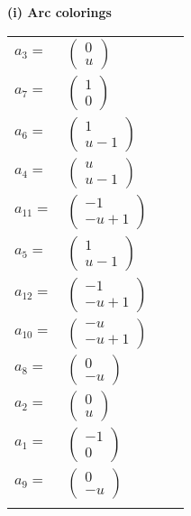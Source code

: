 \documentclass[1p]{elsarticle_modified}
\theoremstyle{definition}
\begin{document}
\flushleft \textbf{(i) Arc colorings}\\
\begin{tabular}{m{7pt} m{180pt} m{7pt} m{180pt} }
\flushright $a_{3}=$&$\begin{pmatrix}0\\u\end{pmatrix}$ \\
\flushright $a_{7}=$&$\begin{pmatrix}1\\0\end{pmatrix}$ \\
\flushright $a_{6}=$&$\begin{pmatrix}1\\u-1\end{pmatrix}$ \\
\flushright $a_{4}=$&$\begin{pmatrix}u\\u-1\end{pmatrix}$ \\
\flushright $a_{11}=$&$\begin{pmatrix}-1\\- u+1\end{pmatrix}$ \\
\flushright $a_{5}=$&$\begin{pmatrix}1\\u-1\end{pmatrix}$ \\
\flushright $a_{12}=$&$\begin{pmatrix}-1\\- u+1\end{pmatrix}$ \\
\flushright $a_{10}=$&$\begin{pmatrix}- u\\- u+1\end{pmatrix}$ \\
\flushright $a_{8}=$&$\begin{pmatrix}0\\- u\end{pmatrix}$ \\
\flushright $a_{2}=$&$\begin{pmatrix}0\\u\end{pmatrix}$ \\
\flushright $a_{1}=$&$\begin{pmatrix}-1\\0\end{pmatrix}$ \\
\flushright $a_{9}=$&$\begin{pmatrix}0\\- u\end{pmatrix}$\\&\end{tabular}
\end{document}
